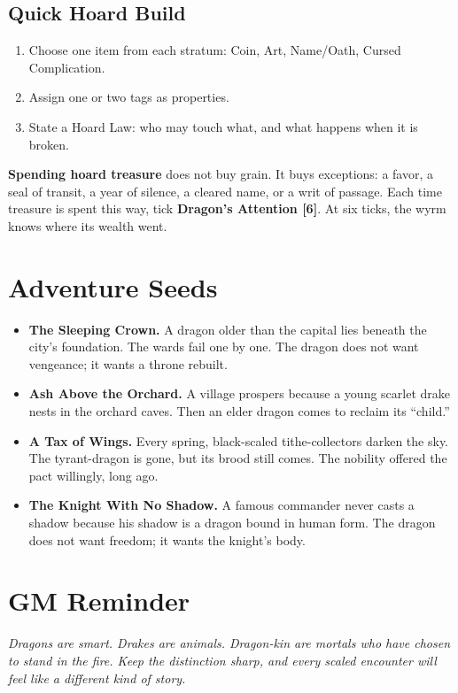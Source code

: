 \subsection*{Quick Hoard Build}

\begin{enumerate}
  \item Choose one item from each stratum: Coin, Art, Name/Oath, Cursed Complication.
  \item Assign one or two tags as properties.
  \item State a Hoard Law: who may touch what, and what happens when it is broken.
\end{enumerate}

\noindent
\textbf{Spending hoard treasure} does not buy grain. It buys exceptions: a favor, a seal of transit, a year of silence, a cleared name, or a writ of passage. Each time treasure is spent this way, tick \textbf{Dragon's Attention [6]}. At six ticks, the wyrm knows where its wealth went.

\section{Adventure Seeds}

\begin{itemize}
  \item \textbf{The Sleeping Crown.} A dragon older than the capital lies beneath the city's foundation. The wards fail one by one. The dragon does not want vengeance; it wants a throne rebuilt.
  \item \textbf{Ash Above the Orchard.} A village prospers because a young scarlet drake nests in the orchard caves. Then an elder dragon comes to reclaim its ``child.''
  \item \textbf{A Tax of Wings.} Every spring, black-scaled tithe-collectors darken the sky. The tyrant-dragon is gone, but its brood still comes. The nobility offered the pact willingly, long ago.
  \item \textbf{The Knight With No Shadow.} A famous commander never casts a shadow because his shadow is a dragon bound in human form. The dragon does not want freedom; it wants the knight's body.
\end{itemize}

\section*{GM Reminder}

\noindent
\textit{Dragons are smart. Drakes are animals. Dragon-kin are mortals who have chosen to stand in the fire. Keep the distinction sharp, and every scaled encounter will feel like a different kind of story.}
